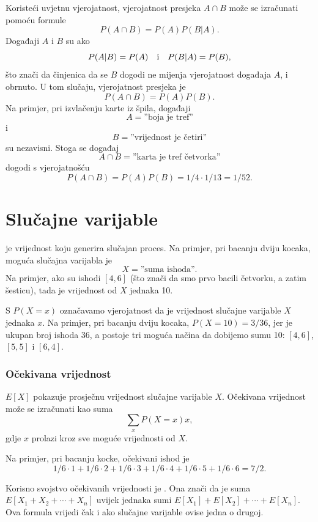 
Koristeći uvjetnu vjerojatnost,
vjerojatnost presjeka
$A \cap B$ može se izračunati pomoću formule
\[P(A \cap B)=P(A)P(B|A).\]
Događaji $A$ i $B$ su  ako
\[P(A|B)=P(A) \hspace{10px}\textrm{i}\hspace{10px} P(B|A)=P(B),\]
što znači da činjenica da se $B$ dogodi ne
mijenja vjerojatnost događaja $A$, i obrnuto.
U tom slučaju, vjerojatnost presjeka je
\[P(A \cap B)=P(A)P(B).\]
Na primjer, pri izvlačenju karte iz špila, događaji
\[A = \textrm{''boja je tref''}\]
i
\[B = \textrm{''vrijednost je četiri''}\]
su nezavisni. Stoga se događaj
\[A \cap B = \textrm{''karta je tref četvorka''}\]
dogodi s vjerojatnošću
\[P(A \cap B)=P(A)P(B)=1/4 \cdot 1/13 = 1/52.\]

\section{Slučajne varijable}


 je vrijednost koju generira
slučajan proces.
Na primjer, pri bacanju dviju kocaka,
moguća slučajna varijabla je
\[X=\textrm{''suma ishoda''}.\]
Na primjer, ako su ishodi $[4,6]$
(što znači da smo prvo bacili četvorku, a zatim šesticu),
tada je vrijednost od $X$ jednaka 10.

S $P(X=x)$ označavamo vjerojatnost da
je vrijednost slučajne varijable $X$ jednaka $x$.
Na primjer, pri bacanju dviju kocaka,
$P(X=10)=3/36$,
jer je ukupan broj ishoda 36,
a postoje tri moguća načina da dobijemo
sumu 10: $[4,6]$, $[5,5]$ i $[6,4]$.

\subsubsection{Očekivana vrijednost}


 $E[X]$ pokazuje
prosječnu vrijednost slučajne varijable $X$.
Očekivana vrijednost može se izračunati kao suma
\[\sum_x P(X=x)x,\]
gdje $x$ prolazi kroz sve moguće vrijednosti od $X$.

Na primjer, pri bacanju kocke,
očekivani ishod je
\[1/6 \cdot 1 + 1/6 \cdot 2 + 1/6 \cdot 3 + 1/6 \cdot 4 + 1/6 \cdot 5 + 1/6 \cdot 6 = 7/2.\]

Korisno svojstvo očekivanih vrijednosti je .
Ona znači da je suma
$E[X_1+X_2+\cdots+X_n]$
uvijek jednaka sumi
$E[X_1]+E[X_2]+\cdots+E[X_n]$.
Ova formula vrijedi čak i ako slučajne varijable
ovise jedna o drugoj.

